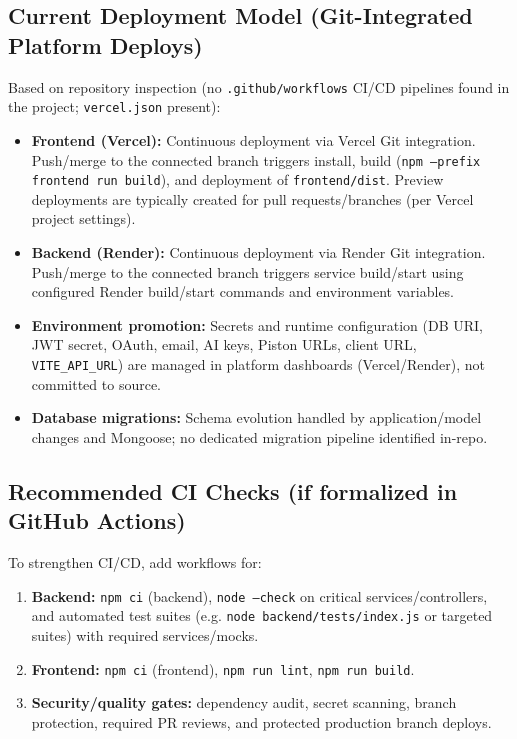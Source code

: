 ﻿\documentclass[11pt,a4paper]{article}
\begin{document}
\subsection{Current Deployment Model (Git-Integrated Platform Deploys)}
Based on repository inspection (no \texttt{.github/workflows} CI/CD pipelines found in the project; \texttt{vercel.json} present):
\begin{itemize}[leftmargin=*]
  \item \textbf{Frontend (Vercel):} Continuous deployment via Vercel Git integration. Push/merge to the connected branch triggers install, build (\texttt{npm --prefix frontend run build}), and deployment of \texttt{frontend/dist}. Preview deployments are typically created for pull requests/branches (per Vercel project settings).
  \item \textbf{Backend (Render):} Continuous deployment via Render Git integration. Push/merge to the connected branch triggers service build/start using configured Render build/start commands and environment variables.
  \item \textbf{Environment promotion:} Secrets and runtime configuration (DB URI, JWT secret, OAuth, email, AI keys, Piston URLs, client URL, \texttt{VITE\_API\_URL}) are managed in platform dashboards (Vercel/Render), not committed to source.
  \item \textbf{Database migrations:} Schema evolution handled by application/model changes and Mongoose; no dedicated migration pipeline identified in-repo.
\end{itemize}

\subsection{Recommended CI Checks (if formalized in GitHub Actions)}
To strengthen CI/CD, add workflows for:
\begin{enumerate}[leftmargin=*]
  \item \textbf{Backend:} \texttt{npm ci} (backend), \texttt{node --check} on critical services/controllers, and automated test suites (e.g. \texttt{node backend/tests/index.js} or targeted suites) with required services/mocks.
  \item \textbf{Frontend:} \texttt{npm ci} (frontend), \texttt{npm run lint}, \texttt{npm run build}.
  \item \textbf{Security/quality gates:} dependency audit, secret scanning, branch protection, required PR reviews, and protected production branch deploys.
\end{enumerate}
\end{document}
